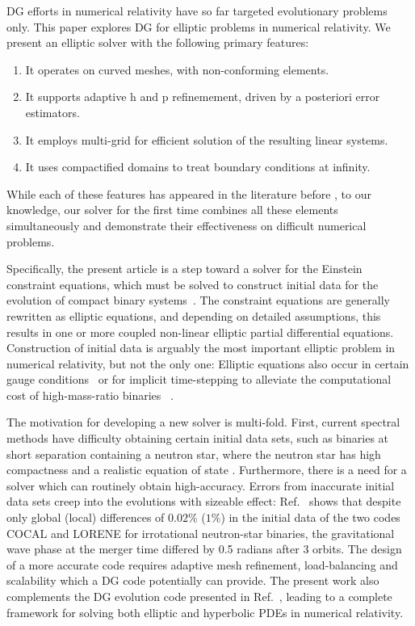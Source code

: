 DG efforts in numerical relativity have so far
targeted evolutionary problems only.
This paper explores DG for elliptic problems in numerical relativity.
We present an elliptic solver with the following primary features:
\begin{enumerate}
\item It operates on curved meshes, with non-conforming elements.
\item It supports adaptive h and p refinemement, driven by a
  posteriori error estimators.
\item It employs multi-grid for efficient solution of the resulting
  linear systems.
\item It uses compactified domains to treat boundary conditions at infinity.
\end{enumerate}
While each of these features has appeared in the literature before
\cite{arnold.d;brezzi.f;cockburn.b;marini.l2002,stiller2017robust,hesthaven2008nodal,kronbichler2018performance,fick2014interior,kozdon2018energy,kozdon2019robust}, to our knowledge, our solver for the first
time combines all these elements simultaneously and demonstrate their
effectiveness on difficult numerical problems.

Specifically, the present article is a step 
toward a solver for the Einstein constraint
equations, which must be solved to
construct initial data for the evolution of compact binary
systems~\cite{pfeiffer:2005,cook2000,baumgarte2010numerical}.  The
constraint equations are generally rewritten as elliptic equations,
and depending on detailed assumptions, this results in one or more
coupled non-linear elliptic partial differential equations.
Construction of initial data is arguably the most important
elliptic problem in numerical relativity, but not the only one:
Elliptic equations also occur in certain gauge
conditions~\cite{baumgarte2010numerical} or for implicit
time-stepping to alleviate the computational cost of high-mass-ratio
binaries~\cite{laupfeiffer2008,lau:2011we}
.
%

The motivation for developing
a new solver is multi-fold. First, current spectral methods have
difficulty obtaining certain initial data sets, such as binaries at
short separation containing a neutron star, where the neutron star has
high compactness and a realistic equation of state
\cite{henriksson:2014tba}.  Furthermore, there is a need for a
solver which can routinely obtain high-accuracy. Errors from
inaccurate initial data sets creep into the evolutions with sizeable
effect: Ref.~\cite{tsokaros2016initialfixed} shows that despite only
global (local) differences of $0.02\%$ ($1\%$) in the initial data of
the two codes COCAL and LORENE for irrotational neutron-star binaries,
the gravitational wave phase at the merger time differed by 0.5
radians after 3 orbits. The design of a more accurate code requires adaptive mesh refinement, load-balancing and
scalability which a DG code potentially can
provide. The present work also complements the DG evolution code presented in Ref.~\cite{kidder:16},
leading to a complete framework for solving both
elliptic and hyperbolic PDEs in numerical relativity.
%

